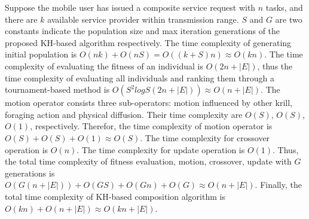 \documentclass[journal]{IEEEtran}
\begin{document}
Suppose the mobile user has issued a composite service request with $n$ tasks, and there are $k$ available service provider within transmission range. $S$ and $G$ are two constants indicate the population size and max iteration generations of the proposed KH-based algorithm respectively.
The time complexity of generating initial population is $O(nk)+O(nS) = O((k+S)n) \approx O(kn)$.
The time complexity of evaluating the fitness of an individual is $O(2n+|E|)$, thus the time complexity of evaluating all individuals and ranking them through a tournament-based method is $O(S^2logS(2n+|E|)) \approx O(n+|E|)$.
The motion operator consists three sub-operators: motion influenced by other krill, foraging action and physical diffusion. Their time complexity are $O(S)$, $O(S)$, $O(1)$, respectively. Therefor, the time complexity of motion operator is $O(S)+O(S)+O(1) \approx O(S)$.
The time complexity for crossover operation is $O(n)$.
The time complexity for update operation is $O(1)$.
Thus, the total time complexity of fitness evaluation, motion, crossover, update with $G$ generations is $O(G(n+|E|)) + O(GS) + O(Gn) + O(G) \approx O(n+|E|)$. 
Finally, the total time complexity of KH-based composition algorithm is $O(kn) + O(n+|E|) \approx O(kn+|E|)$.
\end{document}
